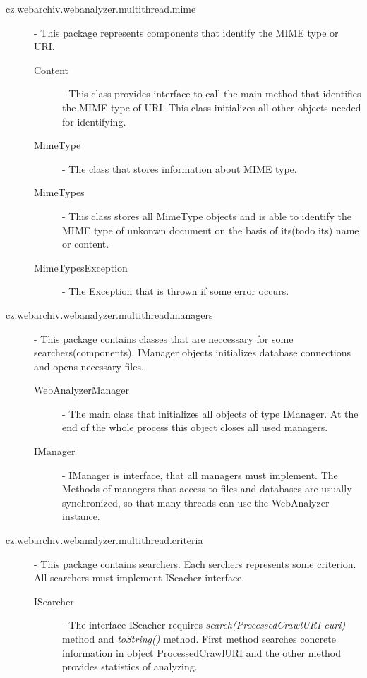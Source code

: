 \documentclass[11pt,a4paper]{article}
\begin{document}
\begin{description}
\item[cz.webarchiv.webanalyzer.multithread.mime] - This package represents components that identify the MIME type or URI.
\begin{description}
\item[Content] - This class provides interface to call the main method that identifies the MIME type of URI. This class initializes all other objects needed for identifying.
\item[MimeType] - The class that stores information about MIME type.
\item[MimeTypes] - This class stores all MimeType objects and is able to identify the MIME type of unkonwn document on the basis of its(todo its) name or content.
\item[MimeTypesException] - The Exception that is thrown if some error occurs.
\end{description}

\item[cz.webarchiv.webanalyzer.multithread.managers] - This package contains classes that are neccessary for some searchers(components). I\-Ma\-na\-ger objects initializes database connections and opens necessary files.
\begin{description}
\item[WebAnalyzerManager] - The main class that initializes all objects of type IManager. At the end of the whole process this object closes all used managers.
\item[IManager] - IManager is interface, that all managers must implement. The Methods of managers that access to files and databases are usually synchronized, so that many threads can use the Web\-A\-na\-lyzer instance.
\end{description}

\item[cz.webarchiv.webanalyzer.multithread.criteria] - This package contains searchers. Each serchers represents some criterion. All searchers must implement ISeacher interface.
\begin{description}
\item[ISearcher] - The interface ISeacher requires \emph{search(ProcessedCrawlURI curi)} method and \emph{toString()} method. First method searches concrete information in object ProcessedCrawlURI and the other method provides statistics of analyzing.
\end{description}

\end{description}
\end{document}
